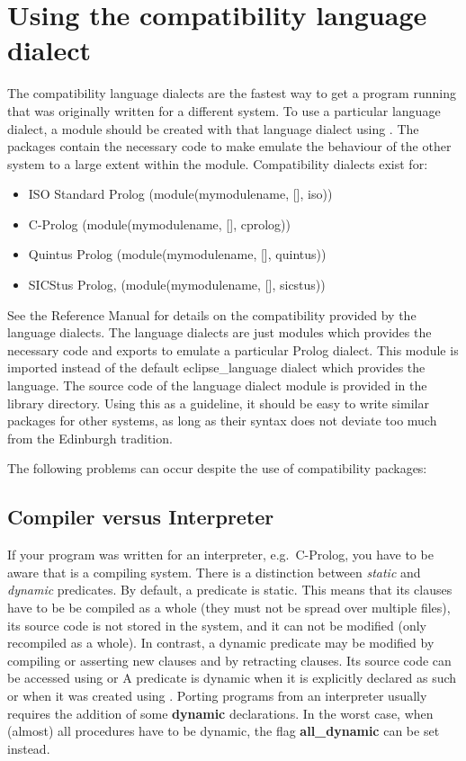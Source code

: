 \section{Using the compatibility language dialect}
The {\eclipse} compatibility language dialects are the fastest way to get a
program running that was originally written for a different system.
To use a particular language dialect, a module
should be created with that language dialect using .
The packages contain the necessary code to make {\eclipse} emulate
the behaviour of the other system to a large extent within the module.
Compatibility dialects exist for:
\begin{itemize}
\item ISO Standard Prolog (module(mymodulename, [], iso))
\item C-Prolog (module(mymodulename, [], cprolog))
\item Quintus Prolog (module(mymodulename, [], quintus))
\item SICStus Prolog, (module(mymodulename, [], sicstus))
\end{itemize}
See the Reference Manual for details on the compatibility provided by the
language dialects. 
The language dialects are just modules which provides the necessary code
and exports  to emulate a particular Prolog dialect. This module is imported
instead of the default eclipse_language dialect which provides the
{\eclipse} language. 
The source code of the language dialect module is provided in the
{\eclipse} library directory.
Using this as a guideline, it should be easy to write similar packages for
other systems, as long as their syntax does not deviate too much
from the Edinburgh tradition. 

The following problems can occur despite the use of compatibility packages:

\subsection{Compiler versus Interpreter}
If your program was written for an interpreter, e.g.\ C-Prolog,
you have to be aware that {\eclipse} is a compiling system.
There is a distinction between {\it static} and {\it dynamic} predicates.
By default, a predicate is static. This means that its clauses have to be
be compiled as a whole (they must not be spread over multiple files),
its source code is not stored in the system, 
and it can not be modified (only recompiled as a whole).
In contrast, a dynamic predicate may be modified by compiling or
asserting new clauses and by retracting clauses.
Its source code can be accessed using  or 
A predicate is dynamic when it is explicitly declared as such or when
it was created using .
Porting programs from an interpreter usually requires the addition of
some {\bf dynamic} declarations.
In the worst case, when (almost) all procedures have to be dynamic,
the flag {\bf all\_dynamic} can be set instead.


